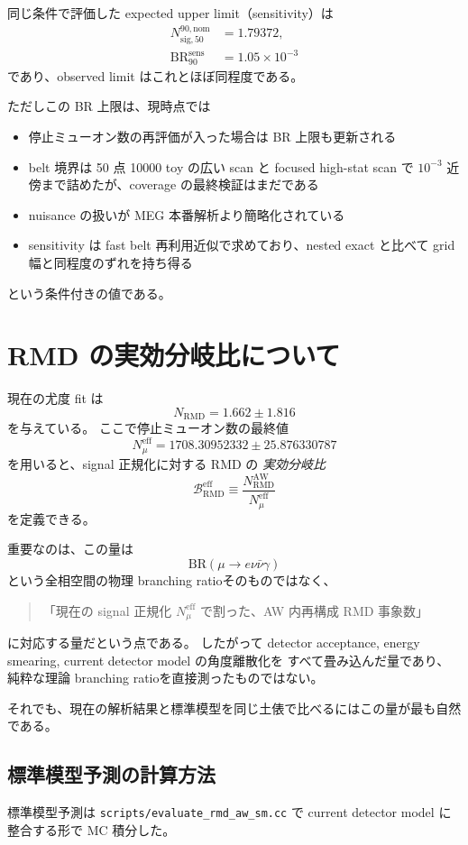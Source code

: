 \documentclass[a4paper,11pt]{jsarticle}
\begin{document}
同じ条件で評価した expected upper limit（sensitivity）は
\begin{align}
N_{\mathrm{sig},50}^{90,\mathrm{nom}} &= 1.79372,\\
\mathrm{BR}_{90}^{\mathrm{sens}} &= 1.05\times 10^{-3}
\end{align}
であり、observed limit はこれとほぼ同程度である。

ただしこの BR 上限は、現時点では
\begin{itemize}
  \item 停止ミューオン数の再評価が入った場合は BR 上限も更新される
  \item belt 境界は 50 点 10000 toy の広い scan と focused high-stat scan で \(10^{-3}\) 近傍まで詰めたが、coverage の最終検証はまだである
  \item nuisance の扱いが MEG 本番解析より簡略化されている
  \item sensitivity は fast belt 再利用近似で求めており、nested exact と比べて grid 幅と同程度のずれを持ち得る
\end{itemize}
という条件付きの値である。

\section{RMD の実効分岐比について}
現在の尤度 fit は
\[
N_{\mathrm{RMD}} = 1.662 \pm 1.816
\]
を与えている。
ここで停止ミューオン数の最終値
\[
N_{\mu}^{\mathrm{eff}} = 1708.30952332 \pm 25.876330787
\]
を用いると、signal 正規化に対する RMD の
\emph{実効分岐比}
\begin{equation}
\mathcal{B}_{\mathrm{RMD}}^{\mathrm{eff}}
\equiv
\frac{N_{\mathrm{RMD}}^{\mathrm{AW}}}{N_{\mu}^{\mathrm{eff}}}
\end{equation}
を定義できる。

重要なのは、この量は
\[
\mathrm{BR}(\mu\to e\nu\bar{\nu}\gamma)
\]
という全相空間の物理 branching ratioそのものではなく、
\begin{quote}
「現在の signal 正規化 \(N_\mu^{\mathrm{eff}}\) で割った、AW 内再構成 RMD 事象数」
\end{quote}
に対応する量だという点である。
したがって detector acceptance, energy smearing, current detector model の角度離散化を
すべて畳み込んだ量であり、純粋な理論 branching ratioを直接測ったものではない。

それでも、現在の解析結果と標準模型を同じ土俵で比べるにはこの量が最も自然である。

\subsection{標準模型予測の計算方法}
標準模型予測は
\texttt{scripts/evaluate\_rmd\_aw\_sm.cc}
で current detector model に整合する形で MC 積分した。
\end{document}
